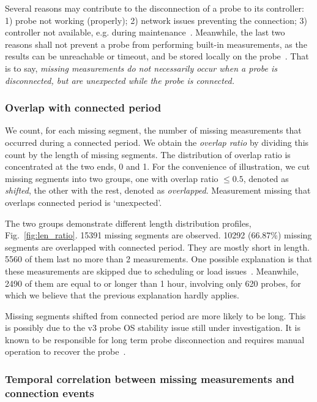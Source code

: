 Several reasons may contribute to the disconnection of a probe to its controller: 1) probe not working (properly); 2) network issues preventing the connection; 3) controller not available, e.g. during maintenance~\cite{controller}. Meanwhile, the last two reasons shall not prevent a probe from performing built-in measurements, as the results can be unreachable or timeout, and be stored locally on the probe~\cite{usb}. 
That is to say, \textit{missing measurements do not necessarily occur when a probe is disconnected, but are unexpected while the probe is connected.}

\subsubsection{Overlap with connected period}
We count, for each missing segment, the number of missing measurements that occurred during a connected period.
We obtain the \textit{overlap ratio} by dividing this count by the length of missing segments. 
The distribution of overlap ratio is concentrated at the two ends, 0 and 1. 
For the convenience of illustration, we cut missing segments into two groups, one with overlap ratio $\leq0.5$, denoted as \textit{shifted}, the other with the rest, denoted as \textit{overlapped}.
Measurement missing that overlaps connected period is `unexpected'.

The two groups demonstrate different length distribution profiles, Fig.~\ref{fig:len_ratio}.
15391 missing segments are observed. 
10292 (66.87\%) missing segments are overlapped with connected period. 
They are mostly short in length. 5560 of them last no more than 2 measurements. 
One possible explanation is that these measurements are skipped due to scheduling or load issues~\cite{schedule, Holterbach2015a}.
Meanwhile, 2490 of them are equal to or longer than 1 hour, involving only 620 probes, for which we believe that the previous explanation hardly applies.

Missing segments shifted from connected period are more likely to be long. This is possibly due to the v3 probe OS stability issue still under investigation. It is known to be responsible for long term probe disconnection and requires manual operation to recover the probe~\cite{usb, 1look, 2look, 3look}.


\subsubsection{Temporal correlation between missing measurements and connection events}

